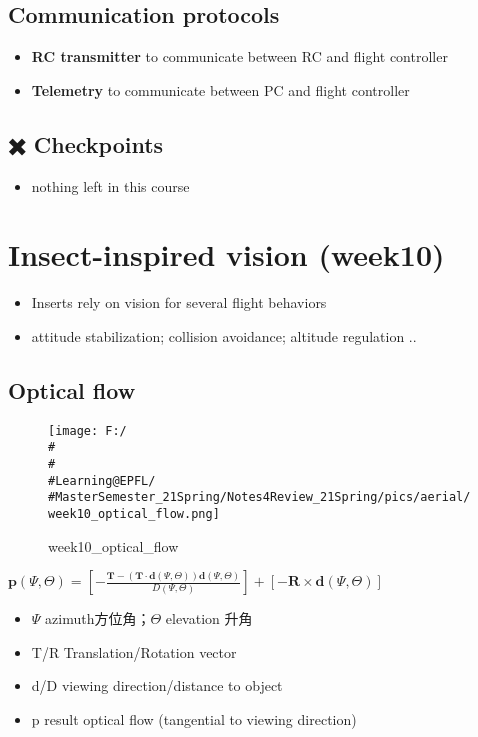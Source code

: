 \documentclass[]{article}
\begin{document}
\subsection{Communication protocols}\label{header-n2325}

\begin{itemize}
\item
  \textbf{RC transmitter} to communicate between RC and flight
  controller
\item
  \textbf{Telemetry} to communicate between PC and flight controller
\end{itemize}

\subsection{✖️ Checkpoints}\label{header-n2331}

\begin{itemize}
\item
  nothing left in this course
\end{itemize}

\section{Insect-inspired vision (week10)}\label{header-n2335}

\begin{itemize}
\item
  Inserts rely on vision for several flight behaviors
\item
  attitude stabilization; collision avoidance; altitude regulation ..
\end{itemize}

\subsection{Optical flow}\label{header-n2341}

\begin{figure}
\centering
\texttt{[image: F:/\\\#\\\#\\\#Learning@EPFL/\\\#MasterSemester\_21Spring/Notes4Review\_21Spring/pics/aerial/week10\_optical\_flow.png]}
\caption{week10\_optical\_flow}
\end{figure}

\(\mathbf{p}(\Psi, \Theta)=\left[-\frac{\mathbf{T}-(\mathbf{T} \cdot \mathbf{d}(\Psi, \Theta)) \mathbf{d}(\Psi, \Theta)}{D(\Psi, \Theta)}\right]+[-\mathbf{R} \times \mathbf{d}(\Psi, \Theta)]\)

\begin{itemize}
\item
  \( \Psi \) azimuth方位角；\(\Theta\) elevation 升角
\item
  T/R Translation/Rotation vector
\item
  d/D viewing direction/distance to object
\item
  p result optical flow (tangential to viewing direction)
\end{itemize}
\end{document}
